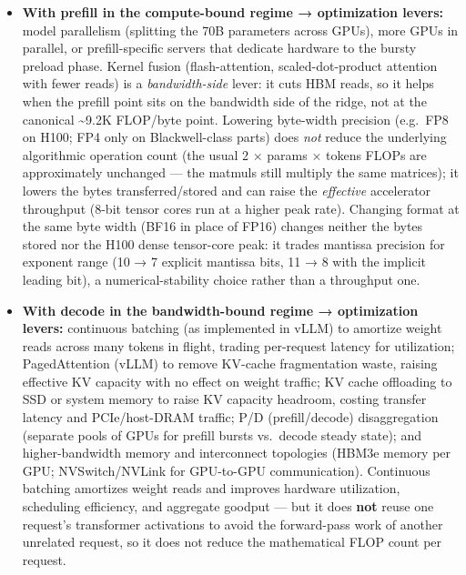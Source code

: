\begin{itemize}
\item
  \textbf{With prefill in the compute-bound regime → optimization
  levers:} model parallelism (splitting the 70B parameters across GPUs),
  more GPUs in parallel, or prefill-specific servers that dedicate
  hardware to the bursty preload phase. Kernel fusion (flash-attention,
  scaled-dot-product attention with fewer reads) is a
  \emph{bandwidth-side} lever: it cuts HBM reads, so it helps when the
  prefill point sits on the bandwidth side of the ridge, not at the
  canonical \textasciitilde9.2K FLOP/byte point. Lowering byte-width
  precision (e.g.~FP8 on H100; FP4 only on Blackwell-class parts) does
  \emph{not} reduce the underlying algorithmic operation count (the
  usual 2 × params × tokens FLOPs are approximately unchanged --- the
  matmuls still multiply the same matrices); it lowers the bytes
  transferred/stored and can raise the \emph{effective} accelerator
  throughput (8-bit tensor cores run at a higher peak rate). Changing
  format at the same byte width (BF16 in place of FP16) changes neither
  the bytes stored nor the H100 dense tensor-core peak: it trades
  mantissa precision for exponent range (10 → 7 explicit mantissa bits,
  11 → 8 with the implicit leading bit), a numerical-stability choice
  rather than a throughput one.
\item
  \textbf{With decode in the bandwidth-bound regime → optimization
  levers:} continuous batching (as implemented in vLLM) to amortize
  weight reads across many tokens in flight, trading per-request latency
  for utilization; PagedAttention (vLLM) to remove KV-cache
  fragmentation waste, raising effective KV capacity with no effect on
  weight traffic; KV cache offloading to SSD or system memory to raise
  KV capacity headroom, costing transfer latency and PCIe/host-DRAM
  traffic; P/D (prefill/decode) disaggregation (separate pools of GPUs
  for prefill bursts vs.~decode steady state); and higher-bandwidth
  memory and interconnect topologies (HBM3e memory per GPU;
  NVSwitch/NVLink for GPU-to-GPU communication). Continuous batching
  amortizes weight reads and improves hardware utilization, scheduling
  efficiency, and aggregate goodput --- but it does \textbf{not} reuse
  one request's transformer activations to avoid the forward-pass work
  of another unrelated request, so it does not reduce the mathematical
  FLOP count per request.
\end{itemize}

